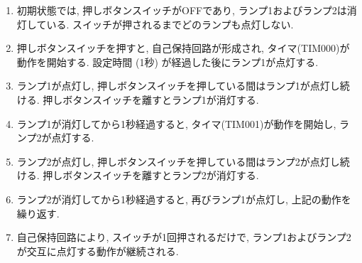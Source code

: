 \begin{enumerate}
  \item 初期状態では, 押しボタンスイッチがOFFであり, ランプ1およびランプ2は消灯している. スイッチが押されるまでどのランプも点灯しない.
  \item 押しボタンスイッチを押すと, 自己保持回路が形成され, タイマ(TIM000)が動作を開始する. 設定時間 (1秒) が経過した後にランプ1が点灯する.
  \item ランプ1が点灯し, 押しボタンスイッチを押している間はランプ1が点灯し続ける. 押しボタンスイッチを離すとランプ1が消灯する.
  \item ランプ1が消灯してから1秒経過すると, タイマ(TIM001)が動作を開始し, ランプ2が点灯する.
  \item ランプ2が点灯し, 押しボタンスイッチを押している間はランプ2が点灯し続ける. 押しボタンスイッチを離すとランプ2が消灯する.
  \item ランプ2が消灯してから1秒経過すると, 再びランプ1が点灯し, 上記の動作を繰り返す.
  \item 自己保持回路により, スイッチが1回押されるだけで, ランプ1およびランプ2が交互に点灯する動作が継続される.
\end{enumerate}

